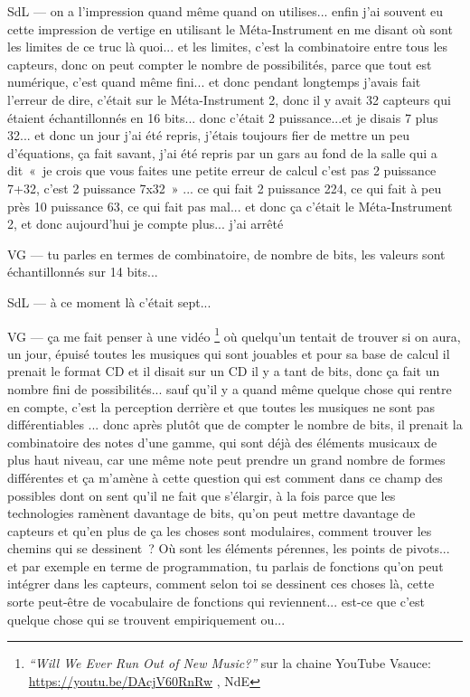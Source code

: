 SdL — on a l'impression quand même quand on utilises... enfin j'ai souvent eu cette impression de vertige en utilisant le Méta-Instrument en me disant où sont les limites de ce truc là quoi... et les limites, c'est la combinatoire entre tous les capteurs, donc on peut compter le nombre de possibilités, parce que tout est numérique, c'est quand même fini... et donc pendant longtemps j'avais fait l'erreur de dire, c'était sur le Méta-Instrument 2, donc il y avait 32 capteurs qui étaient échantillonnés en 16 bits... donc c'était 2 puissance...et je disais 7 plus 32... et donc un jour j'ai été repris, j'étais toujours fier de mettre un peu d'équations, ça fait savant, j'ai été repris par un gars au fond de la salle qui a dit « je crois que vous faites une petite erreur de calcul c'est pas 2 puissance 7+32, c'est 2 puissance 7x32 » ... ce qui fait 2 puissance 224, ce qui fait à peu près 10 puissance 63, ce qui fait pas mal... et donc ça c'était le Méta-Instrument 2, et donc aujourd'hui je compte plus... j'ai arrêté 

VG — tu parles en termes de combinatoire, de nombre de bits, les valeurs sont échantillonnés sur 14 bits... 

SdL — à ce moment là c'était sept... 

VG — ça me fait penser à une vidéo \footnote{\textit{``Will We Ever Run Out of New Music?''} sur la chaine YouTube Vsauce: \url{https://youtu.be/DAcjV60RnRw} , NdE} où quelqu'un tentait de trouver si on aura, un jour, épuisé toutes les musiques qui sont jouables et pour sa base de calcul il prenait le format CD et il disait sur un CD il y a tant de bits, donc ça fait un nombre fini de possibilités... sauf qu'il y a quand même quelque chose qui rentre en compte, c'est la perception derrière et que toutes les musiques ne sont pas différentiables ... donc après plutôt que de compter le nombre de bits, il prenait la combinatoire des notes d'une gamme, qui sont déjà des éléments musicaux de plus haut niveau, car une même note peut prendre un grand nombre de formes différentes et ça m'amène à cette question qui est comment dans ce champ des possibles dont on sent qu'il ne fait que s'élargir, à la fois parce que les technologies ramènent davantage de bits, qu'on peut mettre davantage de capteurs et qu'en plus de ça les choses sont modulaires, comment trouver les chemins qui se dessinent ? Où sont les éléments pérennes, les points de pivots... et par exemple en terme de programmation, tu parlais de fonctions qu'on peut intégrer dans les capteurs, comment selon toi se dessinent ces choses là, cette sorte peut-être de vocabulaire de fonctions qui reviennent... est-ce que c'est quelque chose qui se trouvent empiriquement ou... 

